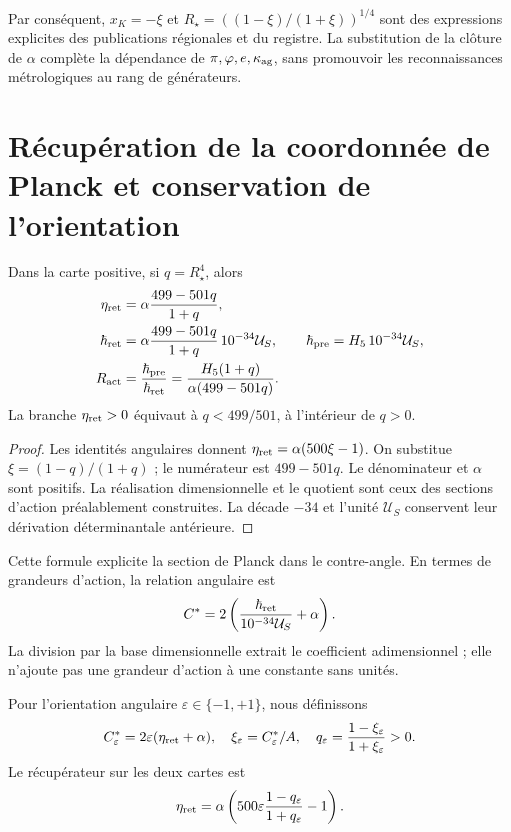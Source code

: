 Par conséquent, \(x_K=-\xi\) et \(R_\star=((1-\xi)/(1+\xi))^{1/4}\) sont des expressions explicites des publications régionales et du registre. La substitution de la clôture de \(\alpha\) complète la dépendance de \(\pi,\varphi,e,\kappa_{\rm ag}\), sans promouvoir les reconnaissances métrologiques au rang de générateurs.

\section{Récupération de la coordonnée de Planck et conservation de l'orientation}

\begin{theorem}
\label{x_reciprocidad:rec:thm:accion}
Dans la carte positive, si \(q=R_\star^4\), alors
\begin{align}
 \eta_{\rm ret}&=\alpha\frac{499-501q}{1+q},\label{x_reciprocidad:rec:eq:eta-radio}\\
 \hbar_{\rm ret}&=\alpha\frac{499-501q}{1+q}\,10^{-34}\mathcal U_S,
 \qquad\hbar_{\rm pre}=H_5\,10^{-34}\mathcal U_S,\label{x_reciprocidad:rec:eq:planck-radio}\\
 R_{\rm act}&=\frac{\hbar_{\rm pre}}{\hbar_{\rm ret}}
 =\frac{H_5(1+q)}{\alpha(499-501q)}.\label{x_reciprocidad:rec:eq:ratio-radio}
\end{align}
La branche \(\eta_{\rm ret}>0\) équivaut à \(q<499/501\), à l’intérieur de \(q>0\).
\end{theorem}
\begin{proof}
Les identités angulaires donnent \(\eta_{\rm ret}=\alpha(500\xi-1)\). On substitue \(\xi=(1-q)/(1+q)\) ; le numérateur est \(499-501q\). Le dénominateur et \(\alpha\) sont positifs. La réalisation dimensionnelle et le quotient sont ceux des sections d'action préalablement construites. La décade \(-34\) et l'unité \(\mathcal U_S\) conservent leur dérivation déterminantale antérieure.
\end{proof}

Cette formule explicite la section de Planck dans le contre-angle. En termes de grandeurs d’action, la relation angulaire est
\[
 C^*=2\left(\frac{\hbar_{\rm ret}}{10^{-34}\mathcal U_S}+\alpha\right).
\]
La division par la base dimensionnelle extrait le coefficient adimensionnel ; elle n’ajoute pas une grandeur d’action à une constante sans unités.

Pour l’orientation angulaire \(\varepsilon\in\{-1,+1\}\), nous définissons
\[
 C^*_{\varepsilon}=2\varepsilon(\eta_{\rm ret}+\alpha),\quad
 \xi_\varepsilon=C^*_{\varepsilon}/A,\quad
 q_\varepsilon=\frac{1-\xi_\varepsilon}{1+\xi_\varepsilon}>0.
\]
Le récupérateur sur les deux cartes est
\begin{equation}
 \eta_{\rm ret}=\alpha\left(500\varepsilon
        \frac{1-q_\varepsilon}{1+q_\varepsilon}-1\right).
 \label{x_reciprocidad:rec:eq:eta-orientada}
\end{equation}

